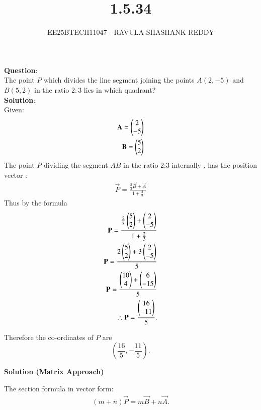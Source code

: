 \documentclass[journal]{article}
\begin{document}
	
	
	\vspace{3cm}
	
\title{1.5.34}
\author{EE25BTECH11047 - RAVULA SHASHANK REDDY}
\maketitle
\hrulefill
\bigskip 

\renewcommand{\thetable}{\theenumi}
\setlength{\intextsep}{10pt}

\textbf{Question}:\\

The point \(P\) which divides the line segment joining the points \(A(2,-5)\) and \(B(5,2)\) in the ratio \(2:3\) lies in which quadrant?\\

\textbf{Solution}:\\

  Given:
\begin{align}
\mathbf{A} = \begin{pmatrix}2 \\ -5\end{pmatrix} \\ \mathbf{B} = \begin{pmatrix}5 \\ 2\end{pmatrix}
\end{align}
The point \(P\) dividing the segment \(AB\) in the ratio 2:3 internally , has the position vector :
\begin{align}
\vec{P} = \frac{\frac{2}{3} \vec{B} + \vec{A}}{1 + \frac{2}{3}} 
\end{align}
Thus by the formula \\
\begin{align} 
\mathbf{P}=\frac{\frac{2}{3}\begin{pmatrix}5 \\ 2\end{pmatrix}+\begin{pmatrix}2\\-5\end{pmatrix}}{1+\frac{2}{3}}\\
\mathbf{P}= \frac{2 \begin{pmatrix}5 \\ 2\end{pmatrix} + 3\begin{pmatrix}2 \\ -5\end{pmatrix}}{5} \\ \mathbf{P}= \frac{\begin{pmatrix}10 \\ 4\end{pmatrix} + \begin{pmatrix}6 \\ -15\end{pmatrix}}{5} \\ 
\therefore \mathbf{P}= \frac{\begin{pmatrix}16 \\ -11\end{pmatrix}}{5}.
\end{align}

Therefore the co-ordinates of \(P\) are \[
\left(\dfrac{16}{5}, -\dfrac{11}{5}\right).
\]

\textbf{Solution (Matrix Approach)}

The section formula in vector form:
\begin{align*}
(m+n)\vec{P} = m\vec{B} + n\vec{A}.
\end{align*}
\end{document}
